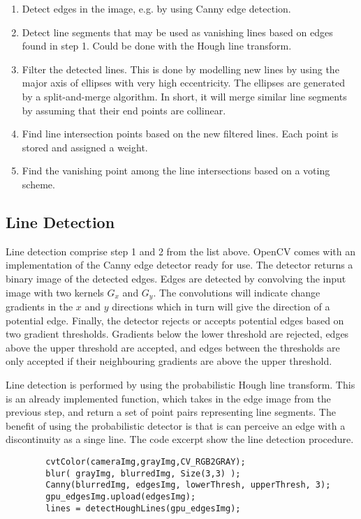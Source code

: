 \begin{enumerate}
	\item Detect edges in the image, e.g. by using Canny edge detection.
	\item Detect line segments that may be used as vanishing lines based on edges found in step 1. Could be done with the Hough line transform.
	\item Filter the detected lines. This is done by modelling new lines by using the major axis of ellipses with very high eccentricity. The ellipses are generated by a split-and-merge algorithm. In short, it will merge similar line segments by assuming that their end points are collinear.
	\item Find line intersection points based on the new filtered lines. Each point is stored and assigned a weight.
	\item Find the vanishing point among the line intersections based on a voting scheme. 
\end{enumerate}

\subsection{Line Detection}

Line detection comprise step 1 and 2 from the list above. OpenCV comes with an implementation of the Canny edge detector ready for use. The detector returns a binary image of the detected edges. Edges are detected by convolving the input image with two kernels $G_x$ and $G_y$. The convolutions will indicate change gradients in the $x$ and $y$ directions which in turn will give the direction of a potential edge. Finally, the detector rejects or accepts potential edges based on two gradient thresholds. Gradients below the lower threshold are rejected, edges above the upper threshold are accepted, and edges between the thresholds are only accepted if their neighbouring gradients are above the upper threshold\cite{cannyedge}. 

Line detection is performed by using the probabilistic Hough line transform. This is an already implemented function, which takes in the edge image from the previous step, and return a set of point pairs representing line segments. The benefit of using the probabilistic detector is that is can perceive an edge with a discontinuity as a singe line. The code excerpt show the line detection procedure.

\begin{verbatim}
        cvtColor(cameraImg,grayImg,CV_RGB2GRAY);
        blur( grayImg, blurredImg, Size(3,3) );
        Canny(blurredImg, edgesImg, lowerThresh, upperThresh, 3);
        gpu_edgesImg.upload(edgesImg);
        lines = detectHoughLines(gpu_edgesImg);        
\end{verbatim}



